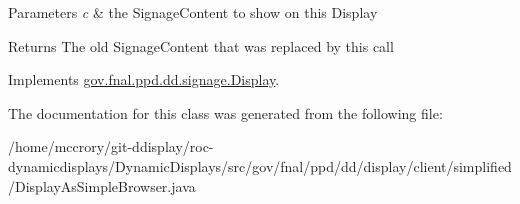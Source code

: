 \begin{DoxyParams}{Parameters}
{\em c} & the Signage\-Content to show on this Display \\
\hline
\end{DoxyParams}
\begin{DoxyReturn}{Returns}
The old Signage\-Content that was replaced by this call 
\end{DoxyReturn}


Implements \hyperlink{interfacegov_1_1fnal_1_1ppd_1_1dd_1_1signage_1_1Display_a703f091805d557d9866d520a32d73929}{gov.\-fnal.\-ppd.\-dd.\-signage.\-Display}.



The documentation for this class was generated from the following file\-:\begin{DoxyCompactItemize}
\item 
/home/mccrory/git-\/ddisplay/roc-\/dynamicdisplays/\-Dynamic\-Displays/src/gov/fnal/ppd/dd/display/client/simplified/Display\-As\-Simple\-Browser.\-java\end{DoxyCompactItemize}
